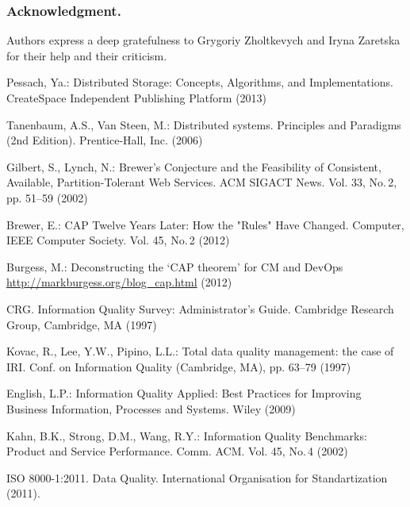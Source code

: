 \documentclass{llncs}
\begin{document}
\newpage
\subsubsection*{Acknowledgment. }
Authors express a deep gratefulness to Grygoriy Zholtkevych and Iryna Zaretska for their help and their criticism.

\begin{thebibliography}{99}

Pessach, Ya.:
Distributed Storage: Concepts, Algorithms, and Implementations.
CreateSpace Independent Publishing Platform (2013)

Tanenbaum, A.S., Van Steen, M.: 
Distributed systems. Principles and Paradigms (2nd Edition).
Prentice-Hall, Inc. (2006)

Gilbert, S., Lynch, N.:
Brewer's Conjecture and the Feasibility of Consistent, Available, Partition-Tolerant
Web Services.
ACM SIGACT News. Vol. 33, No.\,2, pp. 51--59 (2002)

Brewer, E.: 
CAP Twelve Years Later: How the "Rules" Have Changed. 
Computer, IEEE Computer Society. Vol. 45, No.\,2 (2012) 

Burgess, M.:
Deconstructing the `CAP theorem' for CM and DevOps
\url{http://markburgess.org/blog_cap.html} (2012)

CRG. Information Quality Survey: Administrator's Guide. 
Cambridge Research Group, Cambridge, MA (1997)

Kovac, R., Lee, Y.W., Pipino, L.L.:
Total data quality management: the case of IRI.
Conf. on Information Quality (Cambridge, MA), pp. 63--79 (1997)

English, L.P.:
Information Quality Applied: Best Practices for Improving Business Information, Processes
and Systems.
Wiley (2009)

Kahn, B.K., Strong, D.M., Wang, R.Y.:
Information Quality Benchmarks: Product and Service Performance.
Comm. ACM. Vol. 45, No.\,4 (2002)

ISO 8000-1:2011. Data Quality. 
International Organisation for Standartization (2011).

\end{thebibliography}
\end{document}
